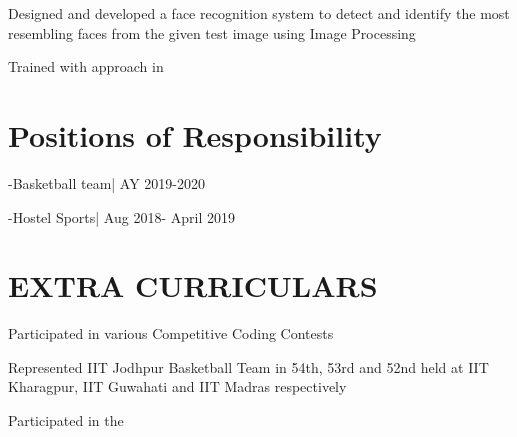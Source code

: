 \documentclass[]{deedy-resume-openfont}
\begin{document}
\begin{minipage}[t]{0.66\textwidth}
\begin{tightemize}\item Designed and developed a face recognition system to detect and identify the most resembling faces from the given test image using Image Processing\\
\item Trained with approach in \end{tightemize}
\sectionsep



\section{Positions of Responsibility} 
\vspace{\topsep} %
\begin{tightemize}
\item {}-Basketball team| AY 2019-2020

\item {}-Hostel Sports| Aug 2018- April 2019
\end{tightemize} 

\section{EXTRA CURRICULARS} 
\vspace{\topsep} %
\begin{tightemize}
\item{ Participated in various Competitive Coding Contests}\\
\item{ Represented IIT Jodhpur Basketball Team in 54th, 53rd and 52nd  held at IIT Kharagpur, IIT Guwahati and IIT Madras respectively}
\item{ Participated in the }\\
\end{tightemize}

\end{minipage} 
\end{document}
